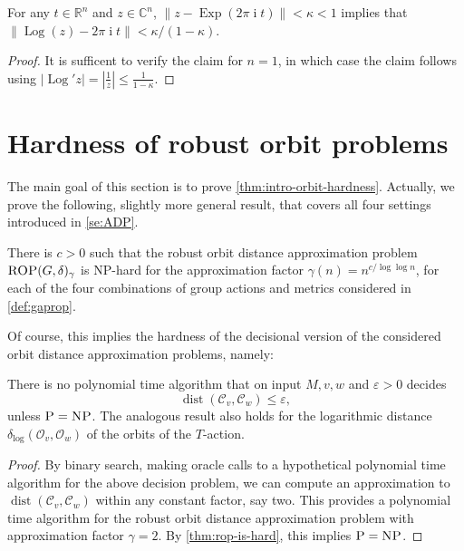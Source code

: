 \documentclass[a4paper,USenglish,cleveref,numberwithinsect]{lipics-v2021}
\DeclareMathOperator{\ii}{i}
\DeclareMathOperator{\Log}{Log}
\DeclareMathOperator{\Exp}{Exp}
\DeclareMathOperator{\dist}{dist}
\newcommand{\distLD}{\delta_{\log}}
\newcommand{\CC}{\mathbb{C}}
\newcommand{\RR}{\mathbb{R}}
\newcommand{\OO}{\ensuremath{\mathcal{O}}}
\newcommand{\KK}{\ensuremath{\mathcal{C}}}
\numberwithin{equation}{section}
\begin{document}

\begin{lemma}\label{le:Lipsch-log}
For any $t\in\RR^n$ and $z\in\CC^n$,
$\|z- \Exp(2\pi\ii t)\| < \kappa<1$ implies that
$\|\Log(z)- 2\pi\ii t \| < \kappa/(1-\kappa)$.
\end{lemma}

\begin{proof}
It is sufficent to verify the claim for $n=1$, in which case the claim follows using $|\Log' z| = |\frac{1}{z}| \le \frac{1}{1-\kappa}$.
\end{proof}


\section{Hardness of robust orbit problems} \label{sec:hardness}

The main goal of this section is to prove \cref{thm:intro-orbit-hardness}.
Actually, we prove the following, slightly more general result,
that covers all four settings introduced in \cref{se:ADP}.

\begin{theorem}
\label{thm:rop-is-hard}
There is $c>0$ such that the robust orbit distance approximation problem
$\textsc{ROP}(G,\delta)_{\gamma}$ is \textsc{NP}-hard for the approximation
factor $\gamma(n)= n^{c/\log\log n}$,
for each of the four combinations of group actions and metrics
considered in \cref{def:gaprop}.
\end{theorem}

Of course, this implies the hardness of the decisional version of the considered orbit distance approximation problems, namely:

\begin{corollary}
There is no polynomial time algorithm that on input $M,v,w$ and $\varepsilon > 0$ decides
\[
	\dist(\KK_v,\KK_w)\leq \varepsilon,
\]
unless $\textsc{P}=\textsc{NP}$. The analogous result also holds
for the logarithmic distance
$\distLD(\OO_v,\OO_w)$ of the orbits of the $T$-action.
\end{corollary}

\begin{proof}
By binary search, making oracle calls to a hypothetical polynomial time algorithm for the above
decision problem, we can compute an approximation to $\dist(\KK_v,\KK_w)$ within any constant factor, say two.
This provides a polynomial time algorithm for
the robust orbit distance approximation problem
with approximation factor $\gamma=2$.
By \cref{thm:rop-is-hard}, this implies $\textsc{P}=\textsc{NP}$.
\end{proof}
\end{document}
